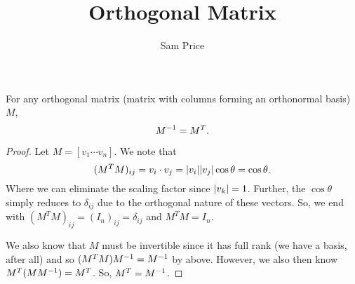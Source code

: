 \documentclass{article}
\author{Sam Price}
\title{Orthogonal Matrix}
\begin{document}
\maketitle

\begin{proposition}{}{}
  For any orthogonal matrix (matrix with columns forming an orthonormal basis) $M$,
  \[ M^{-1} = M^{T}. \]
\end{proposition}
\begin{proof}
  Let $M = [ v_{1} \cdots v_{n} ]$.
  We note that
  \[ (M^{T}M)_{ij} = v_{i} \cdot v_{j} = \lvert v_{i}\rvert\lvert v_{j}\rvert\cos\theta = \cos\theta. \]
  Where we can eliminate the scaling factor since $\lvert v_{k}\rvert = 1$.
  Further, the $\cos\theta$ simply reduces to $\delta_{ij}$ due to the orthogonal nature of these vectors.
  So, we end with $(M^{T}M)_{ij} = (I_{n})_{ij} = \delta_{ij}$ and $M^{T}M = I_{n}$.

  We also know that $M$ must be invertible since it has full rank (we have a basis, after all)
  and so $(M^{T}M)M^{-1} = M^{-1}$ by above. However, we also then know $M^{T}(MM^{-1}) = M^{T}$.
  So, $M^{T} = M^{-1}$.
\end{proof}
\end{document}
